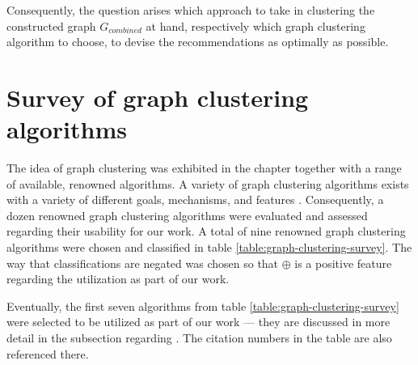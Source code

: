 \documentclass[12pt,a4paper]{report}
\begin{document}
Consequently, the question arises which approach to take in clustering the
constructed graph \(G_{combined}\) at hand, respectively which graph clustering
algorithm to choose, to devise the recommendations as optimally as possible.



\section{Survey of graph clustering algorithms} \label{sect:graph-clustering-algorithm-survey}

The idea of graph clustering was exhibited in the \textit{}
chapter together with a range of available, renowned algorithms.
A variety of graph clustering algorithms exists with a variety of different
goals, mechanisms, and features
\cite{lancichinetti2009community, fortunato2010community, danon2005comparing}.
Consequently, a dozen renowned graph clustering algorithms were evaluated and
assessed regarding their usability for our work.
A total of nine renowned graph clustering algorithms were chosen and classified
in table \ref{table:graph-clustering-survey}.
The way that classifications are negated was chosen so that $\oplus$
is a positive feature regarding the utilization as part of our work.

Eventually, the first seven algorithms from table \ref{table:graph-clustering-survey}
were selected to be utilized as part of our work --- they are discussed
in more detail in the \textit{} subsection regarding
\textit{}.
The citation numbers in the table are also referenced there.
\end{document}
